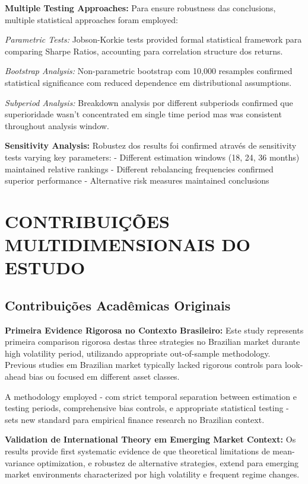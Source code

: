 \textbf{Multiple Testing Approaches:} Para ensure robustness das conclusions, multiple statistical approaches foram employed:

\textit{Parametric Tests:} Jobson-Korkie tests provided formal statistical framework para comparing Sharpe Ratios, accounting para correlation structure dos returns.

\textit{Bootstrap Analysis:} Non-parametric bootstrap com 10,000 resamples confirmed statistical significance com reduced dependence em distributional assumptions.

\textit{Subperiod Analysis:} Breakdown analysis por different subperiods confirmed que superioridade wasn't concentrated em single time period mas was consistent throughout analysis window.

\textbf{Sensitivity Analysis:} Robustez dos results foi confirmed através de sensitivity tests varying key parameters:
- Different estimation windows (18, 24, 36 months) maintained relative rankings
- Different rebalancing frequencies confirmed superior performance
- Alternative risk measures maintained conclusions

\section{CONTRIBUIÇÕES MULTIDIMENSIONAIS DO ESTUDO}

\subsection{Contribuições Acadêmicas Originais}

\textbf{Primeira Evidence Rigorosa no Contexto Brasileiro:} Este study represents primeira comparison rigorosa destas three strategies no Brazilian market durante high volatility period, utilizando appropriate out-of-sample methodology. Previous studies em Brazilian market typically lacked rigorous controls para look-ahead bias ou focused em different asset classes.

A methodology employed - com strict temporal separation between estimation e testing periods, comprehensive bias controls, e appropriate statistical testing - sets new standard para empirical finance research no Brazilian context.

\textbf{Validation de International Theory em Emerging Market Context:} Os results provide first systematic evidence de que theoretical limitations de mean-variance optimization, e robustez de alternative strategies, extend para emerging market environments characterized por high volatility e frequent regime changes.

